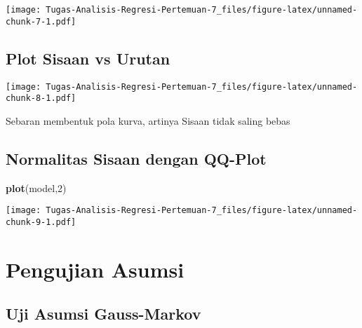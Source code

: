 \documentclass[
]{article}
\newenvironment{Shaded}{\begin{snugshade}}{\end{snugshade}}
\newcommand{\AttributeTok}[1]{\textcolor[rgb]{0.13,0.29,0.53}{#1}}
\newcommand{\DecValTok}[1]{\textcolor[rgb]{0.00,0.00,0.81}{#1}}
\newcommand{\FunctionTok}[1]{\textcolor[rgb]{0.13,0.29,0.53}{\textbf{#1}}}
\newcommand{\NormalTok}[1]{#1}
\newcommand{\SpecialCharTok}[1]{\textcolor[rgb]{0.81,0.36,0.00}{\textbf{#1}}}
\newcommand{\StringTok}[1]{\textcolor[rgb]{0.31,0.60,0.02}{#1}}
\begin{document}
\texttt{[image: Tugas-Analisis-Regresi-Pertemuan-7\_files/figure-latex/unnamed-chunk-7-1.pdf]}

\hypertarget{plot-sisaan-vs-urutan}{%
\subsection{Plot Sisaan vs Urutan}\label{plot-sisaan-vs-urutan}}

\begin{Shaded}
\end{Shaded}

\texttt{[image: Tugas-Analisis-Regresi-Pertemuan-7\_files/figure-latex/unnamed-chunk-8-1.pdf]}

Sebaran membentuk pola kurva, artinya Sisaan tidak saling bebas

\hypertarget{normalitas-sisaan-dengan-qq-plot}{%
\subsection{Normalitas Sisaan dengan
QQ-Plot}\label{normalitas-sisaan-dengan-qq-plot}}

\begin{Shaded}
\begin{Highlighting}[]
\FunctionTok{plot}\NormalTok{(model,}\DecValTok{2}\NormalTok{)}
\end{Highlighting}
\end{Shaded}

\texttt{[image: Tugas-Analisis-Regresi-Pertemuan-7\_files/figure-latex/unnamed-chunk-9-1.pdf]}

\hypertarget{pengujian-asumsi}{%
\section{Pengujian Asumsi}\label{pengujian-asumsi}}

\hypertarget{uji-asumsi-gauss-markov}{%
\subsection{Uji Asumsi Gauss-Markov}\label{uji-asumsi-gauss-markov}}
\end{document}
